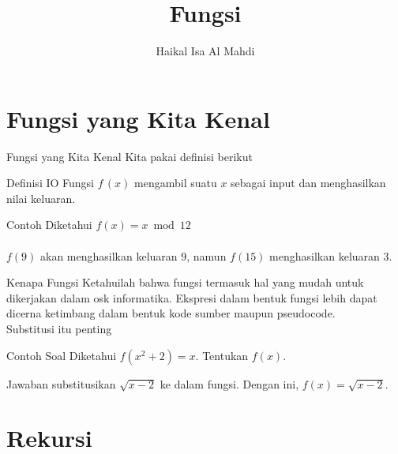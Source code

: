 \documentclass[10pt,aspectratio=54, handout]{beamer}
\author{Haikal Isa Al Mahdi}
\title{Fungsi}
\begin{document}
  \begin{frame}
    \maketitle
  \end{frame}
  
  
  \section{Fungsi yang Kita Kenal}
  \label{sec:Fungsi yang Kita Kenal}
  
  \begin{frame}{Fungsi yang Kita Kenal}
    Kita pakai definisi berikut
    \begin{block}{Definisi IO}
      Fungsi $f\,(x)$ mengambil suatu $x$ sebagai input dan menghasilkan nilai keluaran.
    \end{block}
    
    \begin{exampleblock}{Contoh}
      Diketahui $f(x) = x \bmod 12$ \\~\\
      $f(9)$ akan menghasilkan keluaran $9$, namun $f(15)$ menghasilkan keluaran $3$.
    \end{exampleblock}
  \end{frame}
  
  \begin{frame}{Kenapa Fungsi}
    Ketahuilah bahwa fungsi termasuk hal yang mudah untuk dikerjakan dalam osk informatika. Ekspresi dalam bentuk fungsi lebih dapat dicerna ketimbang dalam bentuk kode sumber maupun pseudocode.
    \\
    Substitusi itu penting
  \begin{exampleblock}{Contoh Soal}
    Diketahui $f(x^2+2) = x$. Tentukan $f(x)$.
  \end{exampleblock}
  
  \begin{block}{Jawaban}
    substitusikan $\sqrt{x-2}$ ke dalam fungsi. Dengan ini, $f(x) = \sqrt{x-2}$.
  \end{block}
  \end{frame}
  
  
  \section{Rekursi}
  \label{sec:Rekursi}
  
\end{document}

